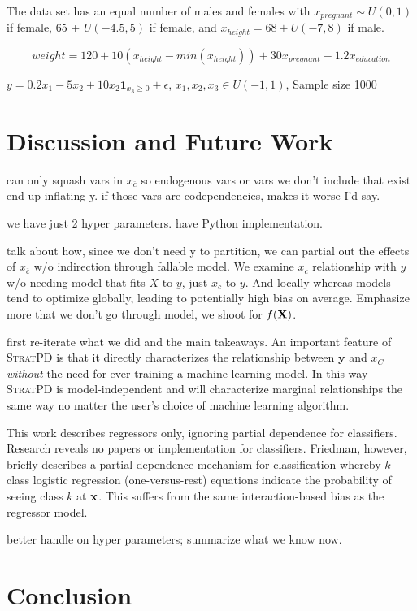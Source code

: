 \documentclass[12pt]{article}
\newcommand{\spd}{\fontfamily{cmr}\textsc{\small StratPD}}
\newcommand{\xnc}{$x_{\overline{c}}$}
\begin{document}
The data set has an equal number of males and females with $x_{pregnant} \sim U(0,1)$ if female, 65 + $U(-4.5,5)$ if female, and $x_{height} = 68 + U(-7,8)$ if male. 

\[
weight = 120 + 10(x_{height} - min(x_{height})) + 30x_{pregnant} - 1.2x_{education}
\]

$y = 0.2x_1 - 5x_2 + 10x_2\mathbf{1}_{x_3 \geq 0} + \epsilon$, $x_1, x_2, x_3 \in U(-1,1)$, Sample size 1000

\section{Discussion and Future Work}

can only squash vars in \xnc{} so endogenous vars or vars we don't include that exist end up inflating y. if those vars are codependencies, makes it worse I'd say.

we have just 2 hyper parameters. have Python implementation.

talk about how, since we don't need y to partition, we can partial out the effects of \xnc{} w/o indirection through fallable model.  We examine $x_c$ relationship with $y$ w/o needing model that fits $X$ to $y$, just $x_c$ to $y$. And locally whereas models tend to optimize globally, leading to potentially high bias on average. Emphasize more that we don't go through model, we shoot for $f(\bf X)$.

{\color{red} first re-iterate what we did and the main takeaways}. An important feature of \spd{} is that it directly characterizes the relationship between $\mathbf{y}$ and $x_C$ \emph{without} the need for ever training a machine learning model. In this way \spd{} is {model-independent} and will characterize marginal relationships the same way no matter the user's choice of machine learning algorithm. 

This work describes regressors only, ignoring partial dependence for classifiers.  Research reveals no papers or implementation for classifiers. Friedman, however, briefly describes a partial dependence mechanism for classification whereby $k$-class logistic regression (one-versus-rest) equations indicate the probability of seeing class $k$ at $\bf{x}$.  This suffers from the same interaction-based bias as the regressor model.

better handle on hyper parameters; summarize what we know now.

\section{Conclusion}
\label{sec:conc}
\end{document}

